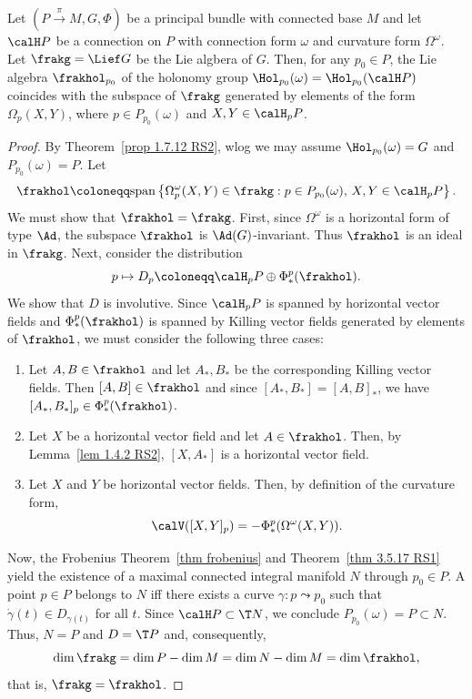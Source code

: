\begin{thm}\label{thm 1.7.15 RS2 Ambrose-Singer}
    Let $(P\overset{\pi}{\to}M,G,\Phi)$ be a principal bundle with connected base $M$ and let $\calH P$ be a connection on $P$ with connection form $\omega$ and curvature form $\Omega^\omega$. Let $\frakg=\Lief G$ be the Lie algbera of $G$. Then, for any $p_0\in P$, the Lie algebra $\frakhol_{p_0}$ of the holonomy group $\Hol_{p_0}(\omega)=\Hol_{p_0}(\calH P)$ coincides with the subspace of $\frakg$ generated by elements of the form $\Omega_p(X,Y)$, where $p\in P_{p_0}(\omega)$ and $X,Y\in\calH_p P$.
\end{thm}
\begin{proof}
    By Theorem~\ref{prop 1.7.12 RS2}, \gls{wlog} we may assume $\Hol_{p_0}(\omega)=G$ and $P_{p_0}(\omega)=P$. Let
    \[\frakhol\coloneqq \mathrm{span}\left\{\Omega^\omega_p(X,Y)\in\frakg : p\in P_{p_0}(\omega),\, X,Y\in\calH_p P\right\}.\]
    We must show that $\frakhol=\frakg$. First, since $\Omega^\omega$ is a horizontal form of type $\Ad$, the subspace $\frakhol$ is $\Ad(G)$-invariant. Thus $\frakhol$ is an ideal in $\frakg$. Next, consider the distribution
    \[p\mapsto D_p\coloneqq \calH_pP \oplus \Phi^p_\ast(\frakhol).\]
    We show that $D$ is involutive. Since $\calH_p P$ is spanned by horizontal vector fields and $\Phi^p_\ast(\frakhol)$ is spanned by Killing vector fields generated by elements of $\frakhol$, we must consider the following three cases:
    \begin{enumerate}[label=(\alph*)]
        \item Let $A,B\in\frakhol$ and let  $A_\ast,B_\ast$ be the corresponding Killing vector fields. Then $[A,B]\in\frakhol$ and since $[A_\ast,B_\ast]=[A,B]_\ast$, we have $[A_\ast,B_\ast]_p\in \Phi^p_\ast(\frakhol)$.
        \item Let $X$ be a horizontal vector field and let $A\in\frakhol$. Then, by Lemma~\ref{lem 1.4.2 RS2}, $[X,A_\ast]$ is a horizontal vector field.
        \item Let $X$ and $Y$ be horizontal vector fields. Then, by definition of the curvature form,
        \[\calV([X,Y]_p)=-\Phi^p_\ast(\Omega^\omega(X,Y)).\]
    \end{enumerate}
    Now, the Frobenius Theorem~\ref{thm frobenius} and Theorem~\ref{thm 3.5.17 RS1} yield the existence of a maximal connected integral manifold $N$ through $p_0\in P$. A point $p\in P$ belongs to $N$ iff there exists a curve $\gamma:p\leadsto p_0$ such that $\dot\gamma(t)\in D_{\gamma(t)}$ for all $t$. Since $\calH P\subset \T N$, we conclude $P_{p_0}(\omega)=P\subset N$. Thus, $N=P$ and $D=\T P$ and, consequently,
    \[\dim\frakg=\dim P-\dim M=\dim N-\dim M=\dim\frakhol,\]
    that is, $\frakg=\frakhol$.
\end{proof}

